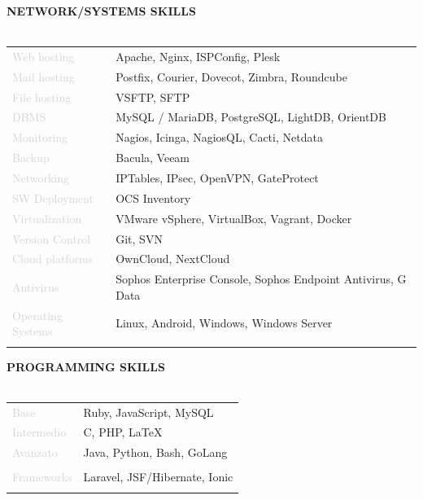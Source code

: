 \documentclass{article}
\begin{document}
\textbf{\textcolor{deepblue}{NETWORK/SYSTEMS SKILLS}} \\\\ \hfill
\begin{tabular}{ R{4cm} l }
	\textcolor{lightgray}{Web hosting}       & Apache, Nginx, ISPConfig, Plesk                              \\ \hfill
	\textcolor{lightgray}{Mail hosting}      & Postfix, Courier, Dovecot, Zimbra, Roundcube                 \\ \hfill
	\textcolor{lightgray}{File hosting}      & VSFTP, SFTP                                                  \\ \hfill
	\textcolor{lightgray}{DBMS}              & MySQL / MariaDB, PostgreSQL, LightDB, OrientDB               \\ \hfill
	\textcolor{lightgray}{Monitoring}        & Nagios, Icinga, NagiosQL, Cacti, Netdata                     \\ \hfill
	\textcolor{lightgray}{Backup}            & Bacula, Veeam                                                \\ \hfill
	\textcolor{lightgray}{Networking}        & IPTables, IPsec, OpenVPN, GateProtect                        \\ \hfill
	\textcolor{lightgray}{SW Deployment}     & OCS Inventory                                                \\ \hfill
	\textcolor{lightgray}{Virtualization}    & VMware vSphere, VirtualBox, Vagrant, Docker                  \\ \hfill
	\textcolor{lightgray}{Version Control}   & Git, SVN                                                     \\ \hfill
	\textcolor{lightgray}{Cloud platforms}   & OwnCloud, NextCloud                                          \\ \hfill
	\textcolor{lightgray}{Antivirus}         & Sophos Enterprise Console, Sophos Endpoint Antivirus, G Data \\ \hfill
	\textcolor{lightgray}{Operating Systems} & Linux, Android, Windows, Windows Server                      \\ \hfill
\end{tabular}

\textbf{\textcolor{deepblue}{PROGRAMMING SKILLS}} \\\\ \hfill
\begin{tabular}{ R{4cm} l }
	\textcolor{lightgray}{Base}       & Ruby, JavaScript, MySQL       \\ \hfill
	\textcolor{lightgray}{Intermedio} & C, PHP, LaTeX                 \\ \hfill
	\textcolor{lightgray}{Avanzato}   & Java, Python, Bash, GoLang    \\\\ \hfill
	\textcolor{lightgray}{Frameworks} & Laravel, JSF/Hibernate, Ionic \\ \hfill
\end{tabular}
\end{document}
